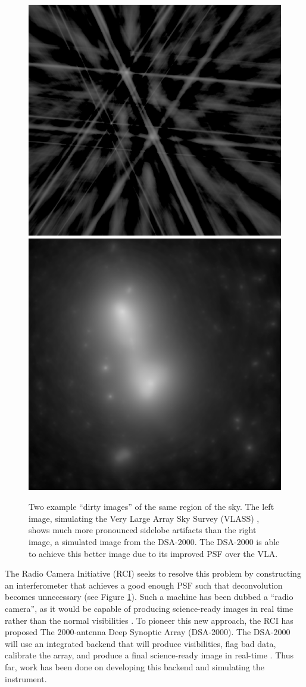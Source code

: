 \documentclass{article}
\begin{document}
\begin{multicols*}{2}
\begin{figure}
    \centering
        \includegraphics[height=0.4\linewidth]{images/dirty VLASS.png}
        \includegraphics[height=0.4\linewidth]{images/dirty DSA.png}
    \caption{Two example ``dirty images'' of the same region of the sky. The left image, simulating the Very Large Array Sky Survey (VLASS) \cite{Lacy_2020}, shows much more pronounced sidelobe artifacts than the right image, a simulated image from the DSA-2000. The DSA-2000 is able to achieve this better image due to its improved PSF over the VLA.}
    \label{fig:dirty_image}
\end{figure}

The Radio Camera Initiative (RCI) seeks to resolve this problem by constructing an interferometer that achieves a good enough PSF such that deconvolution becomes unnecessary (see Figure \ref{fig:dirty_image}). Such a machine has been dubbed a ``radio camera'', as it would be capable of producing science-ready images in real time rather than the normal visibilities \cite{dsa2000}. To pioneer this new approach, the RCI has proposed The 2000-antenna Deep Synoptic Array (DSA-2000). The DSA-2000 will use an integrated backend that will produce visibilities, flag bad data, calibrate the array, and produce a final science-ready image in real-time \cite{dsa2000}. Thus far, work has been done on developing this backend and simulating the instrument.


\end{multicols*}
\end{document}
